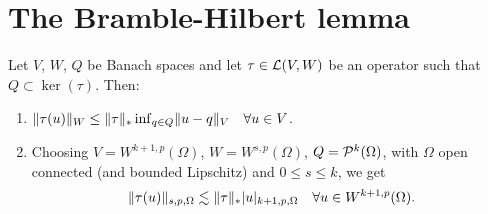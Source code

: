 \section{The Bramble-Hilbert lemma}

\begin{lemma}
Let $V$, $W$, $Q$ be Banach spaces and let $\tau \in \L(V,W)$ be an operator such that $Q \subset \ker(\tau)$. Then:
\begin{enumerate}
\item $\norm{\tau(u)}_W \le \norm{\tau}_* \inf_{q \in Q} \norm{u-q}_V \quad \forall u\in V$.
\item Choosing $V=W^{k+1,p}(\Omega)$, $W=W^{s,p}(\Omega)$, $Q=\P^k(\Omega)$, with $\Omega$ open connected (and bounded Lipschitz) and $0\le s \le k$, we get
\[
\norm{\tau(u)}_{s,p,\Omega} \lesssim \norm{\tau}_* \abs{u}_{k+1,p,\Omega} \quad \forall u\in W^{k+1,p}(\Omega).
\]
\end{enumerate}
\label{lemma:bramble-hilbert}
\end{lemma}

